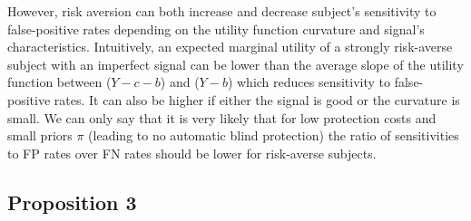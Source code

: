 \documentclass[12pt,a4paper]{article}
\begin{document}
However, risk aversion can both increase and decrease subject's sensitivity to false-positive rates depending on the utility function curvature and signal's characteristics. Intuitively, an expected marginal utility of a strongly risk-averse subject with an imperfect signal can be lower than the average slope of the utility function between ($Y-c-b$) and ($Y-b$) which reduces sensitivity to false-positive rates. It can also be higher if either the signal is good or the curvature is small. We can only say that it is very likely that for low protection costs and small priors $\pi$ (leading to no automatic blind protection) the ratio of sensitivities to FP rates over FN rates should be lower for risk-averse subjects. 


\subsection{Proposition 3}
\end{document}
